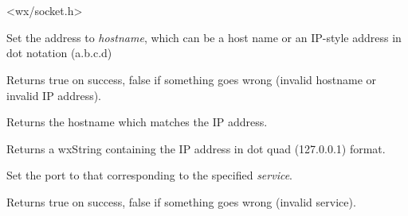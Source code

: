 \section{}\label{wxipv4address}




<wx/socket.h>


%
%

\label{wxipv4addresshostname}


Set the address to {\it hostname}, which can be a host name
or an IP-style address in dot notation (a.b.c.d)


Returns true on success, false if something goes wrong
(invalid hostname or invalid IP address).


Returns the hostname which matches the IP address.

%
%

\label{wxipv4addressipaddress}


Returns a wxString containing the IP address in dot quad (127.0.0.1) format.

%
%

\label{wxipv4addressservice}


Set the port to that corresponding to the specified {\it service}.


Returns true on success, false if something goes wrong
(invalid service).

